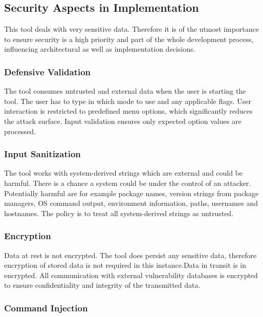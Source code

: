 \subsection{Security Aspects in Implementation}

This tool deals with very sensitive data. Therefore it is of the utmost importance to ensure security is a high priority and part of the whole development process, influencing architectural as well as implementation decisions.

\subsubsection{Defensive Validation}

The tool consumes untrusted and external data when the user is starting the tool. The user has to type in which mode to use and any applicable flags. User interaction is restricted to predefined menu options, which significantly reduces the attack surface. Input validation ensures only expected option values are processed.

\subsubsection{Input Sanitization}

The tool works with system-derived strings which are external and could be harmful. There is a chance a system could be under the control of an attacker. Potentially harmful are for example package names, version strings from package managers, OS command output, environment information, paths, usernames and hostnames. The policy is to treat all system-derived strings as untrusted.

\subsubsection{Encryption}

Data at rest is not encrypted. The tool does persist any sensitive data, therefore encryption of stored data is not required in this instance.\newline\newline Data in transit is in encrypted. All communication with external vulnerability databases is encrypted to ensure confidentiality and integrity of the transmitted data.

\subsubsection{Command Injection}

